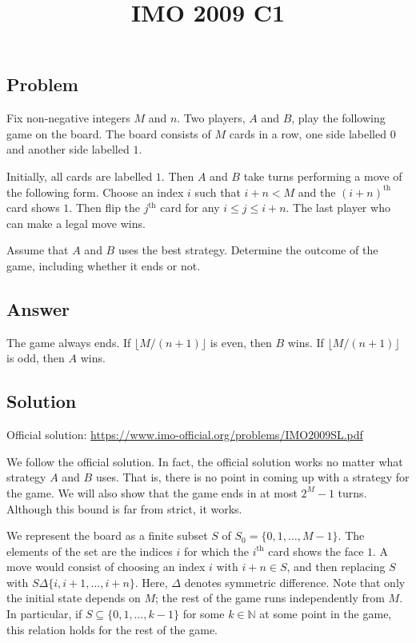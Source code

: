 \documentclass{article}
\title{IMO 2009 C1}
\author{}
\date{}
\newcommand{\N}{\mathbb{N}}
\begin{document}
\maketitle



\subsection*{Problem}

Fix non-negative integers $M$ and $n$.
Two players, $A$ and $B$, play the following game on the board.
The board consists of $M$ cards in a row, one side labelled $0$ and another side labelled $1$.

Initially, all cards are labelled $1$.
Then $A$ and $B$ take turns performing a move of the following form.
Choose an index $i$ such that $i + n < M$ and the $(i + n)^{\text{th}}$ card shows $1$.
Then flip the $j^{\text{th}}$ card for any $i \leq j \leq i + n$.
The last player who can make a legal move wins.

Assume that $A$ and $B$ uses the best strategy.
Determine the outcome of the game, including whether it ends or not.



\subsection*{Answer}

The game always ends.
If $\lfloor M/(n + 1) \rfloor$ is even, then $B$ wins.
If $\lfloor M/(n + 1) \rfloor$ is odd, then $A$ wins.



\subsection*{Solution}

Official solution: \url{https://www.imo-official.org/problems/IMO2009SL.pdf}

We follow the official solution.
In fact, the official solution works no matter what strategy $A$ and $B$ uses.
That is, there is no point in coming up with a strategy for the game.
We will also show that the game ends in at most $2^M - 1$ turns.
Although this bound is far from strict, it works.

We represent the board as a finite subset $S$ of $S_0 = \{0, 1, \ldots, M - 1\}$.
The elements of the set are the indices $i$ for which the $i^{\text{th}}$ card shows the face $1$.
A move would consist of choosing an index $i$ with $i + n \in S$, and then replacing $S$ with $S \Delta \{i, i + 1, \ldots, i + n\}$.
Here, $\Delta$ denotes symmetric difference.
Note that only the initial state depends on $M$; the rest of the game runs independently from $M$.
In particular, if $S \subseteq \{0, 1, \ldots, k - 1\}$ for some $k \in \N$ at some point in the game, this relation holds for the rest of the game.
\end{document}
